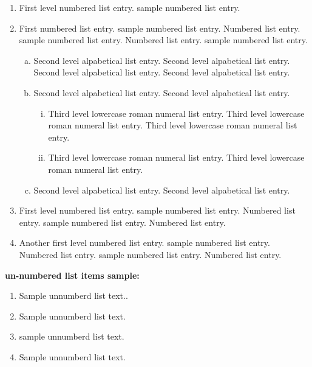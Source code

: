 \documentclass[AMA,STIX1COL]{WileyNJD-SP}
\begin{document}
\begin{enumerate}[1.]
\item First level numbered list entry. sample numbered list entry. 

\item First numbered list entry. sample numbered list entry. Numbered list entry.\cite{Caramana1998} sample numbered list entry. Numbered list entry. sample numbered list entry. 

\begin{enumerate}[a.]
\item Second level alpabetical list entry. Second level alpabetical list entry. Second level alpabetical list entry.\cite{Hoch2009} Second level alpabetical list entry. 

\item Second level alpabetical list entry. Second level alpabetical list entry.\cite{Shashkov1996,Knupp1999,Knupp1999}

\begin{enumerate}[ii.]
\item Third level lowercase roman numeral list entry. Third level lowercase roman numeral list entry. Third level lowercase roman numeral list entry. 

\item Third level lowercase roman numeral list entry. Third level lowercase roman numeral list entry.\cite{Kamm2000}
\end{enumerate}

\item Second level alpabetical list entry. Second level alpabetical list entry.\cite{Taylor1937}
\end{enumerate}

\item First level numbered list entry. sample numbered list entry. Numbered list entry. sample numbered list entry. Numbered list entry. 

\item Another first level numbered list entry. sample numbered list entry. Numbered list entry. sample numbered list entry. Numbered list entry. 
\end{enumerate}

\noindent\textbf{un-numbered list items sample:}

\begin{enumerate}[]
\item Sample unnumberd list text..
\item Sample unnumberd list text.
\item sample unnumberd list text. 
\item Sample unnumberd list text.
\end{enumerate}
\end{document}
